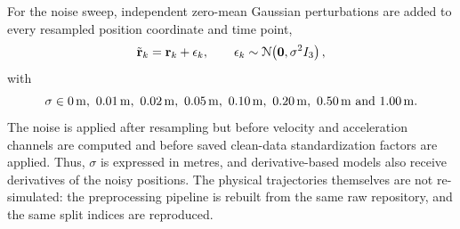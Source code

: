 For the noise sweep, independent zero-mean Gaussian perturbations are added to every resampled position coordinate and time point,
\begin{equation}
    \tilde{\vb{r}}_k
    =
    \vb{r}_k+\vb{\epsilon}_k,
    \qquad
    \vb{\epsilon}_k\sim\mathcal{N}\!\left(\vb{0},\sigma^2 I_3\right),
\end{equation}
with
\begin{equation*}
    \sigma\in
    \SIlist{0;0.01;0.02;0.05;0.10;0.20;0.50;1.00}{\meter}.
\end{equation*}
The noise is applied after resampling but before velocity and acceleration channels are computed and before saved clean-data standardization factors are applied. Thus, $\sigma$ is expressed in metres, and derivative-based models also receive derivatives of the noisy positions.\cite{chartrand2011numerical}
The physical trajectories themselves are not re-simulated: the preprocessing pipeline is rebuilt from the same raw repository, and the same split indices are reproduced.
